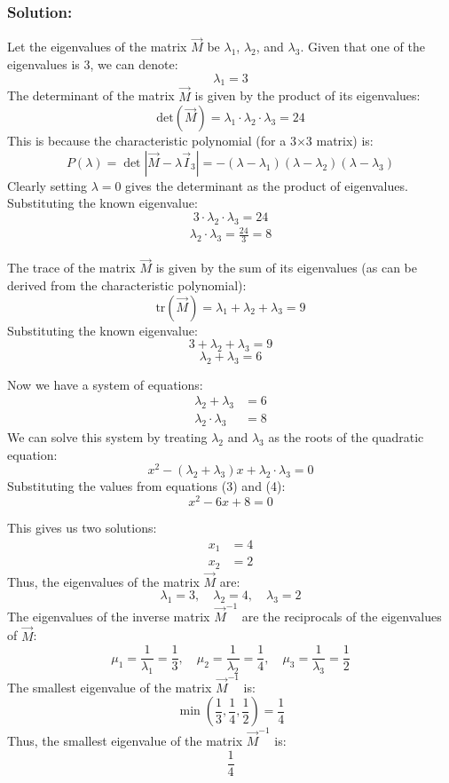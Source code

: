 \documentclass{beamer}
\begin{document}
\begin{frame}
    \frametitle{Solution: }
    Let the eigenvalues of the matrix $\vec{M}$ be $\lambda_1$, $\lambda_2$, and $\lambda_3$. Given that one of the eigenvalues is 3, we can denote:
    \[\lambda_1 = 3\]
    The determinant of the matrix $\vec{M}$ is given by the product of its eigenvalues:
    \[\text{det}(\vec{M}) = \lambda_1 \cdot \lambda_2 \cdot \lambda_3 = 24\]
    This is because the characteristic polynomial (for a 3$\times$3 matrix) is:
    \[P(\lambda) = \det\left|\vec{M}-\lambda \vec{I}_3\right| = -(\lambda - \lambda_1)(\lambda - \lambda_2)(\lambda - \lambda_3)\]
    Clearly setting $\lambda = 0$ gives the determinant as the product of eigenvalues.
    Substituting the known eigenvalue:
    \[3 \cdot \lambda_2 \cdot \lambda_3 = 24\]
    \begin{align}
        \lambda_2 \cdot \lambda_3 = \frac{24}{3} = 8
    \end{align}
\end{frame}
\begin{frame}
    The trace of the matrix $\vec{M}$ is given by the sum of its eigenvalues (as can be derived from the characteristic polynomial):
    \[\text{tr}(\vec{M}) = \lambda_1 + \lambda_2 + \lambda_3 = 9\]
    Substituting the known eigenvalue:
    \[3 + \lambda_2 + \lambda_3 = 9\]
    \[\lambda_2 + \lambda_3 = 6\]

    Now we have a system of equations:
    \begin{align}
        \lambda_2 + \lambda_3     & = 6 \\
        \lambda_2 \cdot \lambda_3 & = 8
    \end{align}
    We can solve this system by treating $\lambda_2$ and $\lambda_3$ as the roots of the quadratic equation:
    \[x^2 - (\lambda_2 + \lambda_3)x + \lambda_2 \cdot \lambda_3 = 0\]
    Substituting the values from equations (3) and (4):
    \[x^2 - 6x + 8 = 0\]
\end{frame}
\begin{frame}
    This gives us two solutions:
    \begin{align}
        x_1 & = 4 \\
        x_2 & = 2
    \end{align}
    Thus, the eigenvalues of the matrix $\vec{M}$ are:
    \[\lambda_1 = 3, \quad \lambda_2 = 4, \quad \lambda_3 = 2\]
    The eigenvalues of the inverse matrix $\vec{M}^{-1}$ are the reciprocals of the eigenvalues of $\vec{M}$:
    \[\mu_1 = \frac{1}{\lambda_1} = \frac{1}{3}, \quad \mu_2 = \frac{1}{\lambda_2} = \frac{1}{4}, \quad \mu_3 = \frac{1}{\lambda_3} = \frac{1}{2}\]
    The smallest eigenvalue of the matrix $\vec{M}^{-1}$ is:
    \[\min\left(\frac{1}{3}, \frac{1}{4}, \frac{1}{2}\right) = \frac{1}{4}\]
    Thus, the smallest eigenvalue of the matrix $\vec{M}^{-1}$ is:
    \[\boxed{\frac{1}{4}}\]
\end{frame}
\end{document}
